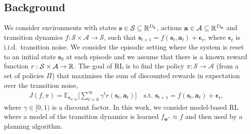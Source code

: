 \documentclass{article} %
\newcommand{\state}{\ensuremath{\mathbf{s}}}
\newcommand{\action}{\ensuremath{\mathbf{a}}}
\newcommand{\noise}{\ensuremath{\bm\epsilon}}
\newcommand{\discount}{\ensuremath{\gamma}}
\newcommand{\stateDomain}{\ensuremath{\mathcal{S}}}
\newcommand{\actionDomain}{\ensuremath{\mathcal{A}}}
\newcommand{\policyDomain}{\ensuremath{\Pi}}
\newcommand{\rewardFn}{\ensuremath{r}}
\newcommand{\transitionFn}{\ensuremath{f}}
\newcommand{\policy}{\ensuremath{\pi}}
\begin{document}
\subsection{Background}
We consider environments with states \(\state \in \stateDomain \subseteq \R^{D_{\state}} \),
actions \(\action \in \actionDomain \subseteq \R^{D_{\action}}\) and transition dynamics
\(\transitionFn: \stateDomain \times \actionDomain \rightarrow \stateDomain \), such that
$\state_{t+1} = \transitionFn(\state_{t}, \action_{t}) + \noise_{t}$, where  $\noise_{t}$
is i.i.d.\ transition noise.
We consider the episodic setting where the system is reset to an initial state $\state_{0}$ at each episode and we
assume that there is a known reward function $r : \stateDomain \times \actionDomain \rightarrow \R$.
The goal of RL is to find the policy \(\pi : \stateDomain \rightarrow \actionDomain\)
(from a set of policies $\Pi$) that maximises the sum of discounted rewards
in expectation over the transition noise,
\begin{align} \label{eq-model-free-objective}
J(\transitionFn, \policy) = \mathbb{E}_{\noise_{0:\infty}} \bigg[ \sum_{t=0}^{\infty} \discount^{t} \rewardFn(\state_{t},\action_{t}) \bigg]
\quad \text{s.t. } \state_{t+1} = \transitionFn(\state_{t}, \action_{t}) + \noise_{t},
\end{align}
where $\gamma \in [0, 1)$ is a discount factor.
In this work, we consider model-based RL where a model of the transition dynamics is learned \(f_{\mathbf{w}^{*}} \approx \transitionFn\) and then used by a planning algorithm.
\end{document}
